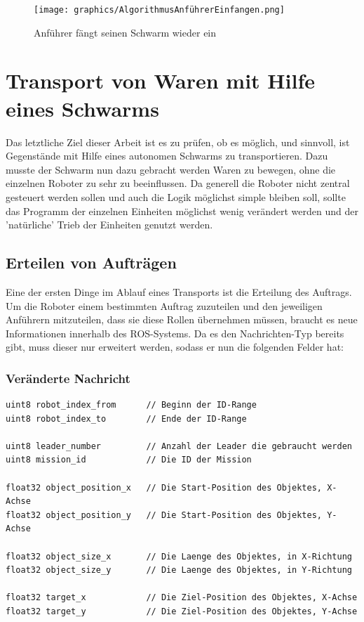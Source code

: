 \begin{figure}
	\texttt{[image: graphics/AlgorithmusAnführerEinfangen.png]}
	\caption{Anführer fängt seinen Schwarm wieder ein}
	\label{pic:AnführerEinfangen}
\end{figure}







\section{Transport von Waren mit Hilfe eines Schwarms}

Das letztliche Ziel dieser Arbeit ist es zu prüfen, ob es möglich, und sinnvoll, ist Gegenstände mit Hilfe eines autonomen Schwarms zu transportieren. Dazu musste der Schwarm nun dazu gebracht werden Waren zu bewegen, ohne die einzelnen Roboter zu sehr zu beeinflussen. Da generell die Roboter nicht zentral gesteuert werden sollen und auch die Logik möglichst simple bleiben soll, sollte das Programm der einzelnen Einheiten möglichst wenig verändert werden und der 'natürliche' Trieb der Einheiten genutzt werden.

\subsection*{Erteilen von Aufträgen}

Eine der ersten Dinge im Ablauf eines Transports ist die Erteilung des Auftrags. Um die Roboter einem bestimmten Auftrag zuzuteilen und den jeweiligen Anführern mitzuteilen, dass sie diese Rollen übernehmen müssen, braucht es neue Informationen innerhalb des ROS-Systems. Da es den Nachrichten-Typ  bereits gibt, muss dieser nur erweitert werden, sodass er nun die folgenden Felder hat:


\subsubsection*{Veränderte Nachricht}

\begin{lstlisting}[style=ros, title=Nachrichten-Typ: New\_Mission]
uint8 robot_index_from		// Beginn der ID-Range
uint8 robot_index_to		// Ende der ID-Range

uint8 leader_number			// Anzahl der Leader die gebraucht werden
uint8 mission_id			// Die ID der Mission

float32 object_position_x	// Die Start-Position des Objektes, X-Achse
float32 object_position_y	// Die Start-Position des Objektes, Y-Achse

float32 object_size_x		// Die Laenge des Objektes, in X-Richtung
float32 object_size_y		// Die Laenge des Objektes, in Y-Richtung

float32 target_x			// Die Ziel-Position des Objektes, X-Achse
float32 target_y			// Die Ziel-Position des Objektes, Y-Achse
\end{lstlisting}

